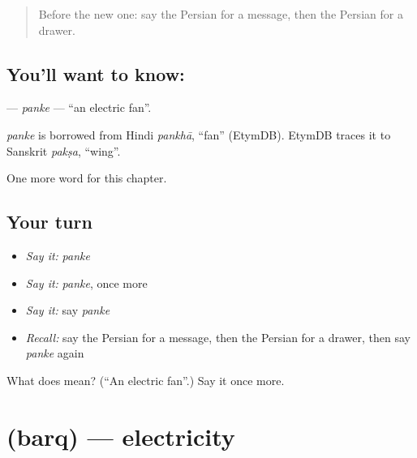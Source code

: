 \label{lesson:FA-C246-panke}



\begin{quote}
Before the new one: say the Persian for a message, then the Persian for a drawer.
\end{quote}

\subsection*{You'll want to know: }
\textbf{} — \emph{panke} — \textquotedblleft{}an electric fan\textquotedblright{}.

\begin{cousinweb}
\emph{panke} is borrowed from Hindi \emph{pankhā}, \textquotedblleft{}fan\textquotedblright{} (EtymDB). EtymDB traces it to Sanskrit \emph{pakṣa}, \textquotedblleft{}wing\textquotedblright{}.
\end{cousinweb}

\begin{grammarlens}[title={What you've built}]
One more word for this chapter.
\end{grammarlens}

\subsection*{Your turn}
\begin{itemize}
\raggedright
  \item \emph{Say it:} \emph{panke}
  \item \emph{Say it:} \emph{panke}, once more
  \item \emph{Say it:} say \emph{panke}
  \item \emph{Recall:} say the Persian for a message, then the Persian for a drawer, then say \emph{panke} again
\end{itemize}

\begin{tcolorbox}[breakable,colback=teal!4,colframe=teal!35!black,title={Before you move on}]
What does  mean? (\textquotedblleft{}An electric fan\textquotedblright{}.) Say it once more.
\end{tcolorbox}
\section[\texorpdfstring{\fa{برق} (barq)}{برق (barq)}]{ (barq) — electricity}

\label{lesson:FA-C246-barq}



